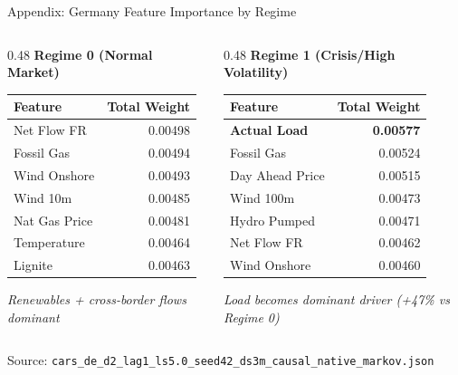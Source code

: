 \documentclass[aspectratio=169]{beamer}
\begin{document}
\begin{frame}{Appendix: Germany Feature Importance by Regime}
\begin{columns}
\begin{column}{0.48\textwidth}
\textbf{Regime 0 (Normal Market)}
\begin{table}
\scriptsize
\begin{tabular}{l|r}
\toprule
\textbf{Feature} & \textbf{Total Weight} \\
\midrule
Net Flow FR & 0.00498 \\
Fossil Gas & 0.00494 \\
Wind Onshore & 0.00493 \\
Wind 10m & 0.00485 \\
Nat Gas Price & 0.00481 \\
Temperature & 0.00464 \\
Lignite & 0.00463 \\
\bottomrule
\end{tabular}
\end{table}
{\tiny \textit{Renewables + cross-border flows dominant}}
\end{column}

\begin{column}{0.48\textwidth}
\textbf{Regime 1 (Crisis/High Volatility)}
\begin{table}
\scriptsize
\begin{tabular}{l|r}
\toprule
\textbf{Feature} & \textbf{Total Weight} \\
\midrule
\textbf{Actual Load} & \textbf{0.00577} \\
Fossil Gas & 0.00524 \\
Day Ahead Price & 0.00515 \\
Wind 100m & 0.00473 \\
Hydro Pumped & 0.00471 \\
Net Flow FR & 0.00462 \\
Wind Onshore & 0.00460 \\
\bottomrule
\end{tabular}
\end{table}
{\tiny \textit{Load becomes dominant driver (+47\% vs Regime 0)}}
\end{column}
\end{columns}

\vspace{0.3cm}
{\scriptsize Source: \texttt{cars\_de\_d2\_lag1\_ls5.0\_seed42\_ds3m\_causal\_native\_markov.json}}
\end{frame}
\end{document}
